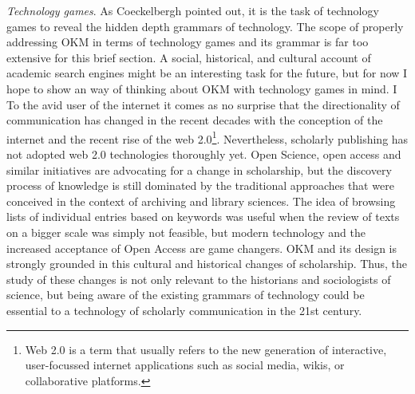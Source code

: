 \textit{Technology games}. As Coeckelbergh pointed out, it is the task of technology games to reveal the hidden depth grammars of technology. The scope of properly addressing OKM in terms of technology games and its grammar is far too extensive for this brief section. A social, historical, and cultural account of academic search engines might be an interesting task for the future, but for now I hope to show an way of thinking about OKM with technology games in mind. I  To the avid user of the internet it comes as no surprise that the directionality of communication has changed in the recent decades with the conception of the internet and the recent rise of the web 2.0\footnote{Web 2.0 is a term that usually refers to the new generation of interactive, user-focussed internet applications such as social media, wikis, or collaborative platforms.}. Nevertheless, scholarly publishing has not adopted web 2.0 technologies thoroughly yet. Open Science, open access and similar initiatives are advocating for a change in scholarship, but the discovery process of knowledge is still dominated by the traditional approaches that were conceived in the context of archiving and library sciences. The idea of browsing lists of individual entries based on keywords was useful when the review of texts on a bigger scale was simply not feasible, but modern technology and the increased acceptance of Open Access are game changers. OKM and its design is strongly grounded in this cultural and historical changes of scholarship. Thus, the study of these changes is not only relevant to the historians and sociologists of science, but being aware of the existing grammars of technology could be essential to a technology of scholarly communication in the 21st century.